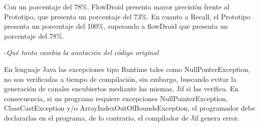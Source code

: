 Con un porcentaje del 78\%, FlowDroid presenta mayor precisión frente al
Prototipo, que presenta un porcentaje del 73\%.\newline
En cuanto a Recall, el Prototipo presenta un porcentaje del 100\%, superando a
flowDroid que presenta un porcentaje del 78\%.


-\textit{Qué tanto cambia la anotación del código original}

En lenguaje Java las excepciones tipo Runtime tales como NullPonterException, no
son verificadas a tiempo de compilación, sin embargo, buscando evitar la
generación de canales encubiertos mediante las mismas, Jif si las verifica. 
En consecuencia, si un programa requiere excepciones NullPointerException,
ClassCastException y/o ArrayIndexOutOfBoundsException, el programador debe
declararlas en el programa, de lo contrario, el compilador de Jif genera error.
























